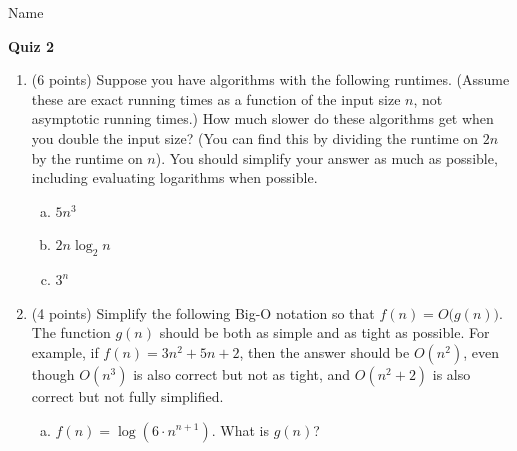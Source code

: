 \documentclass[11pt]{article}
\begin{document}
\noindent Name \underline{\hspace{12cm}}\\


\begin{center}
\LARGE\textbf{Quiz 2}%
\end{center}



\begin{enumerate}

 
\item (6 points) Suppose you have algorithms with the following runtimes.
(Assume these are exact running times as a function of the input size $n$, not
asymptotic running times.) How much slower do these algorithms get when you
double the input size? (You can find this by dividing the runtime on $2n$ by the
runtime on $n$). You should simplify your answer as much as possible, including evaluating
logarithms when possible.

\begin{enumerate}[(a)]
    \item $5n^3$ 
\vspace{1in}
    \item $2n \log_2 n$
\vspace{1in}
    \item $3^{n}$
\end{enumerate}
\vspace{1in}

\item (4 points) Simplify the following Big-O notation so that $f(n) = O\Big(g(n)\Big)$. The function $g(n)$ should be
        both as simple and as tight as possible. For example, if $f(n) = 3n^2 + 5n + 2$,
        then the answer should be $O(n^2)$, even though $O(n^3)$ is also correct but not as tight, and $O(n^2+2)$ is also
        correct but not fully simplified.

\begin{enumerate}[(a)]
    \item $f(n) = \log(6\cdot n^{n+1})$. What is $g(n)$?
\end{enumerate}
        

\end{enumerate}
\end{document}
